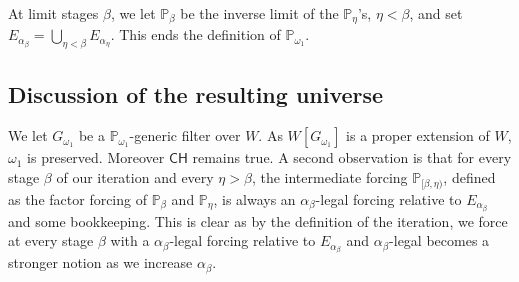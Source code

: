 \documentclass[a4paper,11pt]{article}
\newcommand{\forceP}{\mathbb{P}}
\newcommand{\CH}{\mathsf{CH}}
\begin{document}
At limit stages $\beta$, we let $\forceP_{\beta}$ be the inverse limit of the $\forceP_{\eta}$'s, $\eta < \beta$, and set $E_{\alpha_{\beta}}= \bigcup_{\eta < \beta}  E_{\alpha_{\eta}}$.
This ends the definition of $\forceP_{\omega_1}$.

\subsection{Discussion of the resulting universe}
We let $G_{\omega_1}$ be a $\forceP_{\omega_1}$-generic filter over $W$.
As $W[G_{\omega_1}]$ is a proper extension of $W$, $\omega_1$ is preserved. Moreover $\CH$ remains true.
A second observation is that for every stage $\beta$ of our iteration and every $\eta > \beta$, the intermediate forcing $\forceP_{[\beta, \eta)}$, defined as the factor forcing of $\forceP_{\beta}$ and $\forceP_{\eta}$, is always an $\alpha_{\beta}$-legal forcing relative to $E_{\alpha_{\beta}}$ and some bookkeeping. This is clear as by the definition of the iteration, we force at every stage $\beta$ with a $\alpha_{\beta}$-legal forcing  relative to $E_{\alpha_{\beta}}$ and $\alpha_{\beta}$-legal becomes a stronger notion as we increase $\alpha_{\beta}$.
\end{document}

